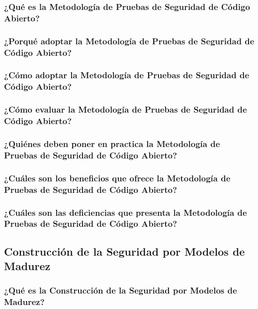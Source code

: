 \documentclass[runningheads,a4paper]{llncs}
\begin{document}
\subsubsection{¿Qué es la Metodología de Pruebas de Seguridad de Código Abierto?}

\subsubsection{¿Porqué adoptar la Metodología de Pruebas de Seguridad de Código Abierto?}

\subsubsection{¿Cómo adoptar la Metodología de Pruebas de Seguridad de Código Abierto?}

\subsubsection{¿Cómo evaluar la Metodología de Pruebas de Seguridad de Código Abierto?}

\subsubsection{¿Quiénes deben poner en practica la Metodología de Pruebas de Seguridad de Código Abierto?}

\subsubsection{¿Cuáles son los beneficios que ofrece la Metodología de Pruebas de Seguridad de Código Abierto?}

\subsubsection{¿Cuáles son las deficiencias que presenta la Metodología de Pruebas de Seguridad de Código Abierto?}


\subsection{Construcción de la Seguridad por Modelos de Madurez}

\subsubsection{¿Qué es la Construcción de la Seguridad por Modelos de Madurez?}
\end{document}

